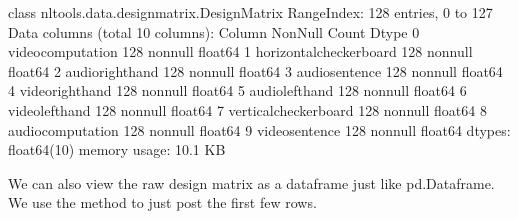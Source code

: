 \documentclass[letterpaper,10pt,english]{sphinxmanual}
\begin{document}
\begin{sphinxVerbatim}[commandchars=\\\{\}]
\PYGZlt{}class \PYGZsq{}nltools.data.design\PYGZus{}matrix.Design\PYGZus{}Matrix\PYGZsq{}\PYGZgt{}
RangeIndex: 128 entries, 0 to 127
Data columns (total 10 columns):
 \PYGZsh{}   Column                   Non\PYGZhy{}Null Count  Dtype  
\PYGZhy{}\PYGZhy{}\PYGZhy{}  \PYGZhy{}\PYGZhy{}\PYGZhy{}\PYGZhy{}\PYGZhy{}\PYGZhy{}                   \PYGZhy{}\PYGZhy{}\PYGZhy{}\PYGZhy{}\PYGZhy{}\PYGZhy{}\PYGZhy{}\PYGZhy{}\PYGZhy{}\PYGZhy{}\PYGZhy{}\PYGZhy{}\PYGZhy{}\PYGZhy{}  \PYGZhy{}\PYGZhy{}\PYGZhy{}\PYGZhy{}\PYGZhy{}  
 0   video\PYGZus{}computation        128 non\PYGZhy{}null    float64
 1   horizontal\PYGZus{}checkerboard  128 non\PYGZhy{}null    float64
 2   audio\PYGZus{}right\PYGZus{}hand         128 non\PYGZhy{}null    float64
 3   audio\PYGZus{}sentence           128 non\PYGZhy{}null    float64
 4   video\PYGZus{}right\PYGZus{}hand         128 non\PYGZhy{}null    float64
 5   audio\PYGZus{}left\PYGZus{}hand          128 non\PYGZhy{}null    float64
 6   video\PYGZus{}left\PYGZus{}hand          128 non\PYGZhy{}null    float64
 7   vertical\PYGZus{}checkerboard    128 non\PYGZhy{}null    float64
 8   audio\PYGZus{}computation        128 non\PYGZhy{}null    float64
 9   video\PYGZus{}sentence           128 non\PYGZhy{}null    float64
dtypes: float64(10)
memory usage: 10.1 KB
\end{sphinxVerbatim}

We can also view the raw design matrix as a dataframe just like pd.Dataframe.  We use the  method to just post the first few rows.

\begin{sphinxVerbatim}[commandchars=\\\{\}]
\end{sphinxVerbatim}
\end{document}

